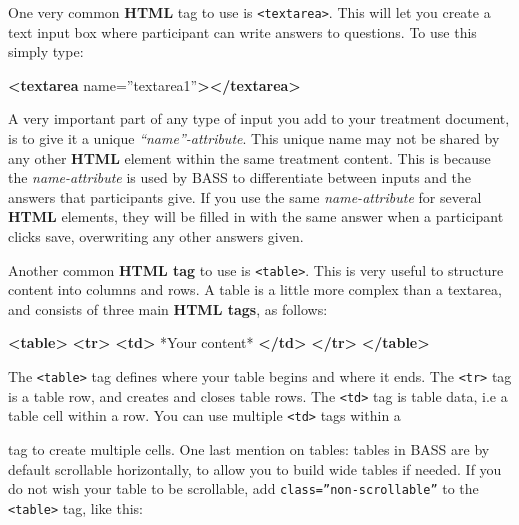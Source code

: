 \documentclass[]{book}
\newenvironment{Shaded}{\begin{snugshade}}{\end{snugshade}}
\newcommand{\KeywordTok}[1]{\textcolor[rgb]{0.13,0.29,0.53}{\textbf{#1}}}
\newcommand{\NormalTok}[1]{#1}
\newcommand{\OtherTok}[1]{\textcolor[rgb]{0.56,0.35,0.01}{#1}}
\newcommand{\StringTok}[1]{\textcolor[rgb]{0.31,0.60,0.02}{#1}}
\begin{document}
One very common \textbf{HTML} tag to use is \texttt{\textless{}textarea\textgreater{}}. This will let you create a text input box where participant can write answers to questions.
To use this simply type:

\begin{Shaded}
\begin{Highlighting}[]
\KeywordTok{<textarea}\OtherTok{ name=}\StringTok{”textarea1”}\KeywordTok{></textarea>}
\end{Highlighting}
\end{Shaded}

A very important part of any type of input you add to your treatment document, is to give it a unique \emph{``name''-attribute}. This unique name may not be shared by any other \textbf{HTML} element within the same treatment content. This is because the \emph{name-attribute} is used by BASS to differentiate between inputs and the answers that participants give. If you use the same \emph{name-attribute} for several \textbf{HTML} elements, they will be filled in with the same answer when a participant clicks save, overwriting any other answers given.

Another common \textbf{HTML tag} to use is \texttt{\textless{}table\textgreater{}}. This is very useful to structure content into columns and rows.
A table is a little more complex than a textarea, and consists of three main \textbf{HTML tags}, as follows:

\begin{Shaded}
\begin{Highlighting}[]
\KeywordTok{<table>}
  \KeywordTok{<tr>}
    \KeywordTok{<td>}
\NormalTok{      *Your content*}
    \KeywordTok{</td>}
  \KeywordTok{</tr>}
\KeywordTok{</table>}
\end{Highlighting}
\end{Shaded}

The \texttt{\textless{}table\textgreater{}} tag defines where your table begins and where it ends. The \texttt{\textless{}tr\textgreater{}} tag is a table row, and creates and closes table rows. The \texttt{\textless{}td\textgreater{}} tag is table data, i.e a table cell within a row. You can use multiple \texttt{\textless{}td\textgreater{}} tags within a

tag to create multiple cells.
One last mention on tables: tables in BASS are by default scrollable horizontally, to allow you to build wide tables if needed. If you do not wish your table to be scrollable, add \texttt{class=”non-scrollable”} to the \texttt{\textless{}table\textgreater{}} tag, like this:
\end{document}
